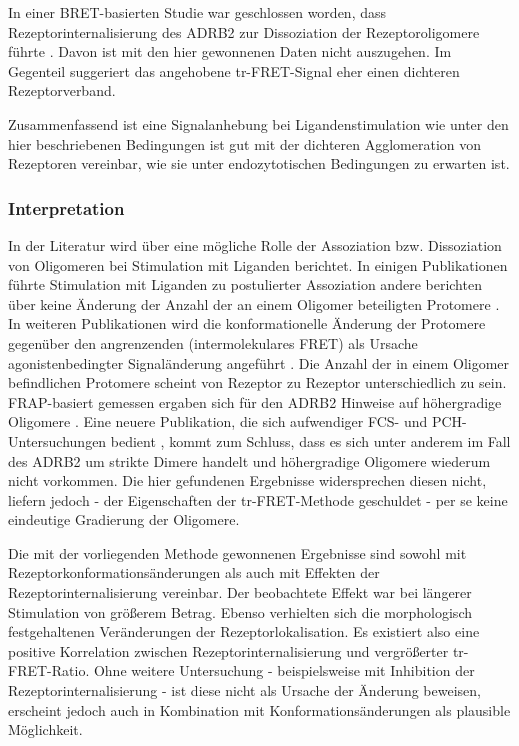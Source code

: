In einer BRET-basierten Studie war geschlossen worden, dass Rezeptorinternalisierung des ADRB2 zur Dissoziation der Rezeptoroligomere führte \parencite{Lan2011}. Davon ist mit den hier gewonnenen Daten nicht auszugehen. Im Gegenteil suggeriert das angehobene tr-FRET-Signal eher einen dichteren Rezeptorverband.

Zusammenfassend ist eine Signalanhebung bei Ligandenstimulation wie unter den hier beschriebenen Bedingungen ist gut mit der dichteren Agglomeration von Rezeptoren vereinbar, wie sie unter endozytotischen Bedingungen zu erwarten ist.  

\subsubsection{Interpretation}
In der Literatur wird über eine mögliche Rolle der Assoziation bzw. Dissoziation von Oligomeren bei Stimulation mit Liganden berichtet. In einigen Publikationen führte Stimulation mit Liganden zu postulierter Assoziation \parencite{Angers2000} andere berichten über keine Änderung der Anzahl der an einem Oligomer beteiligten Protomere \parencite{Dorsch2009}. In weiteren Publikationen wird die konformationelle Änderung der Protomere gegenüber den angrenzenden (intermolekulares FRET) als Ursache agonistenbedingter Signaländerung angeführt \parencite{Fung2009}. Die Anzahl der in einem Oligomer befindlichen Protomere scheint von Rezeptor zu Rezeptor unterschiedlich zu sein. FRAP-basiert gemessen ergaben sich für den ADRB2 Hinweise auf höhergradige Oligomere \parencite{Dorsch2009}. Eine neuere Publikation, die sich aufwendiger FCS- und PCH-Untersuchungen bedient \parencite{Herrick-Davis2013}, kommt zum Schluss, dass es sich unter anderem im Fall des ADRB2 um strikte Dimere handelt und höhergradige Oligomere wiederum nicht vorkommen. Die hier gefundenen Ergebnisse widersprechen diesen nicht, liefern jedoch - der Eigenschaften der tr-FRET-Methode geschuldet - per se keine eindeutige Gradierung der Oligomere. 

Die mit der vorliegenden Methode gewonnenen Ergebnisse sind sowohl mit Rezeptorkonformationsänderungen als auch mit Effekten der Rezeptorinternalisierung vereinbar. Der beobachtete Effekt war bei längerer Stimulation von größerem Betrag. Ebenso verhielten sich die morphologisch festgehaltenen Veränderungen der Rezeptorlokalisation. Es existiert also eine positive Korrelation zwischen Rezeptorinternalisierung und vergrößerter tr-FRET-Ratio. Ohne weitere Untersuchung - beispielsweise mit Inhibition der Rezeptorinternalisierung - ist diese nicht als Ursache der Änderung beweisen, erscheint jedoch auch in Kombination mit Konformationsänderungen als plausible Möglichkeit. 

